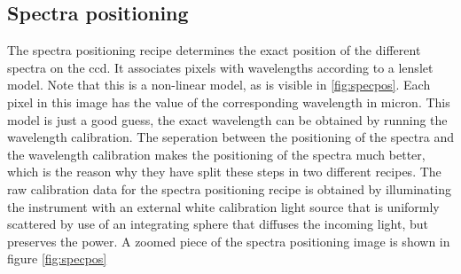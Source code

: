 \documentclass[twoside,single]{lion-msc}
\begin{document}
\subsection{Spectra positioning}
The spectra positioning recipe determines the exact position of the different spectra on the ccd. It associates pixels with wavelengths according to a lenslet model. Note that this is a non-linear model, as is visible in \ref{fig:specpos}. Each pixel in this image has the value of the corresponding wavelength in micron. This model is just a good guess, the exact wavelength can be obtained by running the wavelength calibration. The seperation between the positioning of the spectra and the wavelength calibration makes the positioning of the spectra much better, which is the reason why they have split these steps in two different recipes. The raw calibration data for the spectra positioning recipe is obtained by illuminating the instrument with an external white calibration light source that is uniformly scattered by use of an integrating sphere that diffuses the incoming light, but preserves the power. A zoomed piece of the spectra positioning image is shown in figure \ref{fig:specpos}
\end{document}
